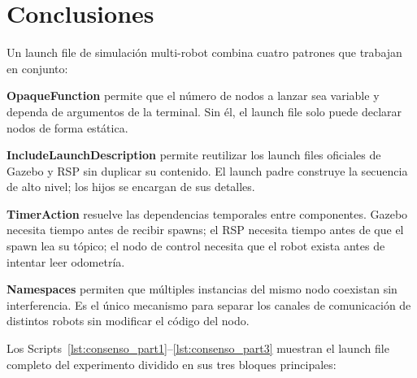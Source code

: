 \section{Conclusiones}

Un launch file de simulación multi-robot combina cuatro patrones que trabajan en conjunto:

\textbf{OpaqueFunction} permite que el número de nodos a lanzar sea variable y dependa de argumentos de la terminal. Sin él, el launch file solo puede declarar nodos de forma estática.

\textbf{IncludeLaunchDescription} permite reutilizar los launch files oficiales de Gazebo y RSP sin duplicar su contenido. El launch padre construye la secuencia de alto nivel; los hijos se encargan de sus detalles.

\textbf{TimerAction} resuelve las dependencias temporales entre componentes. Gazebo necesita tiempo antes de recibir spawns; el RSP necesita tiempo antes de que el spawn lea su tópico; el nodo de control necesita que el robot exista antes de intentar leer odometría.

\textbf{Namespaces} permiten que múltiples instancias del mismo nodo coexistan sin interferencia. Es el único mecanismo para separar los canales de comunicación de distintos robots sin modificar el código del nodo.

Los Scripts~\ref{lst:consenso_part1}--\ref{lst:consenso_part3} muestran el launch file completo del experimento dividido en sus tres bloques principales:




